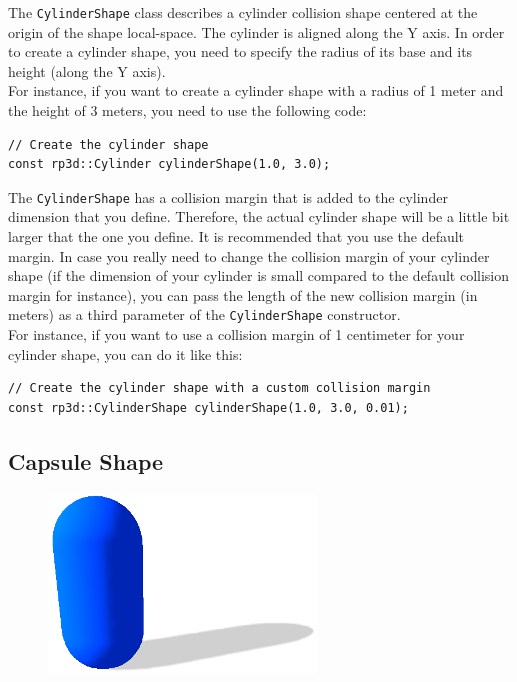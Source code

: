 \documentclass[a4paper,12pt]{article}
\begin{document}
    The \texttt{CylinderShape} class describes a cylinder collision shape centered at the origin of the shape local-space. The cylinder is aligned along the Y axis.
    In order to create a cylinder shape, you need to specify the radius of its base and its height (along the Y axis). \\

    For instance, if you want to create a cylinder shape with a radius of 1 meter and the height of 3 meters, you need to use the following code: \\

    \begin{lstlisting}
// Create the cylinder shape
const rp3d::Cylinder cylinderShape(1.0, 3.0);
  \end{lstlisting}

    \vspace{0.6cm}

    The \texttt{CylinderShape} has a collision margin that is added to the cylinder dimension that you define. Therefore, the actual cylinder shape will be a little bit larger that the one you define.
    It is recommended that you use the default margin. In case you really need to change the collision margin of your cylinder shape (if the dimension of your cylinder is small compared
    to the default collision margin for instance), you can pass the length of the new collision margin (in meters) as a third parameter of the \texttt{CylinderShape} constructor. \\

    For instance, if you want to use a collision margin of 1 centimeter for your cylinder shape, you can do it like this: \\

   \begin{lstlisting}
// Create the cylinder shape with a custom collision margin
const rp3d::CylinderShape cylinderShape(1.0, 3.0, 0.01);
  \end{lstlisting}

    \subsection{Capsule Shape}

    \begin{figure}[h]
        \centering
        \includegraphics{capsuleshape.png}
        \label{fig:capsuleshape}
    \end{figure}
\end{document}

